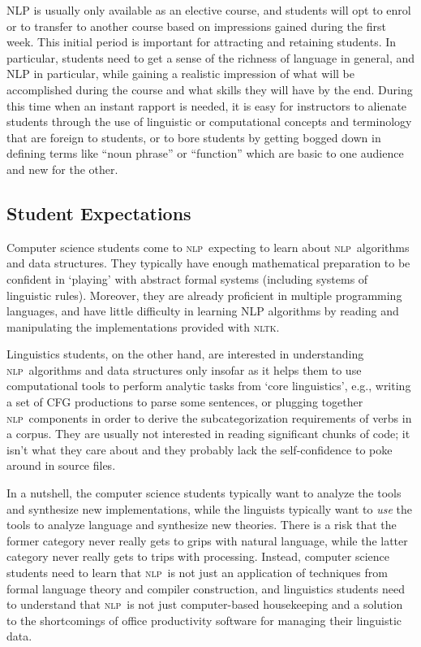 \documentclass[11pt]{article}
\newcommand{\NLP}{\textsc{nlp}}
\newcommand{\NLTK}{\textsc{nltk}}
\begin{document}
NLP is usually only available as an elective course, and students will
opt to enrol or to transfer to another course based on impressions
gained during the first week.  This initial period is important for
attracting and retaining students.  In particular, students need to
get a sense of the richness of language in general, and NLP in particular,
while gaining a realistic impression of what will be accomplished during the course
and what skills they will have by the end.  During this time when an instant rapport
is needed, it is easy for instructors to alienate students through the use of
linguistic or computational concepts and terminology that are foreign to students,
or to bore students by getting bogged down in defining terms like ``noun phrase'' or ``function''
which are basic to one audience and new for the other.

\subsection{Student Expectations}

Computer science students come to \NLP\ expecting to learn about \NLP\
algorithms and data structures.  They typically have enough
mathematical preparation to be confident in `playing' with abstract
formal systems (including systems of linguistic rules).  Moreover,
they are already proficient in multiple programming languages, and
have little difficulty in learning NLP algorithms by reading and
manipulating the implementations provided with \NLTK.

Linguistics students, on the other hand, are interested in
understanding \NLP\ algorithms and data structures only insofar as it helps them
to use computational tools to perform analytic tasks from `core linguistics',
e.g., writing a set of CFG productions to parse some sentences, or
plugging together \NLP\ components in order to derive the subcategorization
requirements of verbs in a corpus.
They are usually not interested in reading significant chunks of code;
it isn't what they care about and they
probably lack the self-confidence to poke around in source files.

In a nutshell, the computer science students typically want to analyze
the tools and synthesize new implementations, while the linguists
typically want to \emph{use} the tools to analyze language and
synthesize new theories.  There is a risk that the former category
never really gets to grips with natural language, while the latter
category never really gets to trips with processing.  Instead,
computer science students need to learn that \NLP\ is not just an
application of techniques from formal language theory and compiler
construction, and linguistics students need to understand that \NLP\ is not
just computer-based housekeeping and a solution to the shortcomings of
office productivity software for managing their linguistic data.
\end{document}
